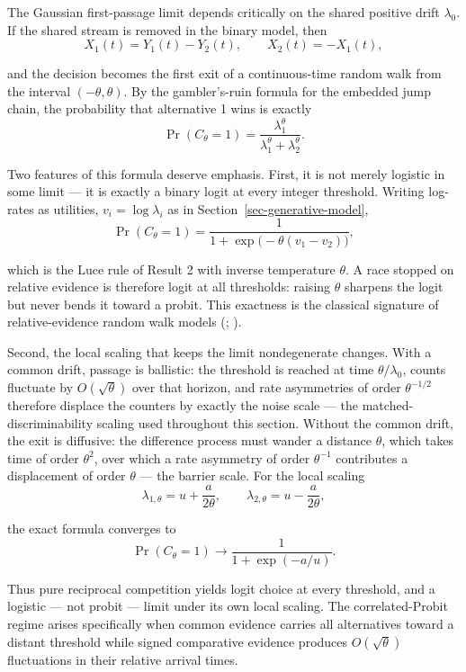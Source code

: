 \documentclass[
  man,
  floatsintext,
  longtable,
  a4paper,
  nolmodern,
  notxfonts,
  notimes,
  colorlinks=true,linkcolor=blue,citecolor=blue,urlcolor=blue]{apa7}
\begin{document}
The Gaussian first-passage limit depends critically on the shared
positive drift \(\lambda_0\). If the shared stream is removed in the
binary model, then \[
X_1(t)=Y_1(t)-Y_2(t),
\qquad
X_2(t)=-X_1(t),
\]

and the decision becomes the first exit of a continuous-time random walk
from the interval \((-\theta,\theta)\). By the gambler's-ruin formula
for the embedded jump chain, the probability that alternative 1 wins is
exactly \[
\Pr(C_\theta=1)
=
\frac{\lambda_1^\theta}
{\lambda_1^\theta+\lambda_2^\theta}.
\]

Two features of this formula deserve emphasis. First, it is not merely
logistic in some limit --- it is exactly a binary logit at every integer
threshold. Writing log-rates as utilities, \(v_i=\log\lambda_i\) as in
Section~\ref{sec-generative-model}, \[
\Pr(C_\theta=1)
=
\frac{1}{1+\exp\bigl(-\theta(v_1-v_2)\bigr)},
\]

which is the Luce rule of Result 2 with inverse temperature \(\theta\).
A race stopped on relative evidence is therefore logit at all
thresholds: raising \(\theta\) sharpens the logit but never bends it
toward a probit. This exactness is the classical signature of
relative-evidence random walk models
(; ).

Second, the local scaling that keeps the limit nondegenerate changes.
With a common drift, passage is ballistic: the threshold is reached at
time \(\theta/\lambda_0\), counts fluctuate by \(O(\sqrt{\theta})\) over
that horizon, and rate asymmetries of order \(\theta^{-1/2}\) therefore
displace the counters by exactly the noise scale --- the
matched-discriminability scaling used throughout this section. Without
the common drift, the exit is diffusive: the difference process must
wander a distance \(\theta\), which takes time of order \(\theta^{2}\),
over which a rate asymmetry of order \(\theta^{-1}\) contributes a
displacement of order \(\theta\) --- the barrier scale. For the local
scaling \[
\lambda_{1,\theta}
=
u+\frac{a}{2\theta},
\qquad
\lambda_{2,\theta}
=
u-\frac{a}{2\theta},
\]

the exact formula converges to \[
\Pr(C_\theta=1)
\longrightarrow
\frac{1}{1+\exp(-a/u)}.
\]

Thus pure reciprocal competition yields logit choice at every threshold,
and a logistic --- not probit --- limit under its own local scaling. The
correlated-Probit regime arises specifically when common evidence
carries all alternatives toward a distant threshold while signed
comparative evidence produces \(O(\sqrt{\theta})\) fluctuations in their
relative arrival times.
\end{document}
